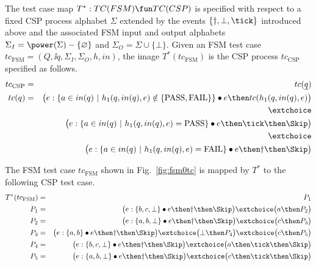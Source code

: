 The test case map $T^* :TC(FSM) \fun TC(CSP)$ is specified with respect to a fixed
CSP process alphabet $\Sigma$ extended by the events $\{\dag,\bot,\tick \}$ introduced
above
and the associated FSM input and output alphabets
$\Sigma_I = \power(\Sigma)-\{\varnothing\}$ and $\Sigma_O=\Sigma\cup \{\bot \}$.
Given an FSM test case $tc_\text{FSM}=(Q,\ii q,\Sigma_I,\Sigma_O,h,in)$, 
the image $T^*(tc_\text{FSM})$ is the CSP process $tc_\text{CSP}$ specified 
as follows.
\begin{eqnarray*}
tc_\text{CSP} & = & tc(\ii q)
\\
tc(q) & = & \big( e : \{ a\in in(q)~|~h_1(q,in(q),e)\notin \{\text{PASS},\text{FAIL}\} \} \bullet e \then tc(h_1(q,in(q),e) \big)
\\ & & \extchoice
\\ & & \big( e : \{ a\in in(q)~|~h_1(q,in(q),e) = \text{PASS} \} \bullet e \then \tick \then \Skip \big)
\\ & & \extchoice
\\ & & \big( e : \{ a\in in(q)~|~h_1(q,in(q),e) = \text{FAIL} \} \bullet e \then \dag \then \Skip \big)
\end{eqnarray*}


\begin{example}
The FSM test case $tc_\text{FSM}$
shown in Fig.~\ref{fig:fsm0tc} is mapped by $T^*$ to the following
CSP test case.
\begin{eqnarray*}
T^*(tc_\text{FSM}) & = & P_1
\\
P_1 & = & \big(e:\{ b,c,\bot \} \bullet e \then \dag\then\Skip\big)
\extchoice
 \big( a \then P_2 \big) 
\\
P_2 & = & \big( e : \{ a,b,\bot \}\bullet e\then \dag\then\Skip  \big)
\extchoice
\big( c\then P_3 \big)
\\
P_3 & = & \big( e : \{ a,b \}\bullet e\then \dag\then\Skip  \big)
\extchoice
\big( \bot \then P_4 \big)
\extchoice
\big( c\then P_5 \big)
\\
P_4 & = & \big( e : \{ b,c,\bot \}\bullet e\then \dag\then\Skip  \big)
\extchoice
\big( a\then\tick\then \Skip \big)
\\
P_5 & = & \big( e : \{ a,b,\bot \}\bullet e\then \dag\then\Skip  \big)
\extchoice
\big( c\then\tick\then \Skip \big)
\end{eqnarray*}
\xbox
\end{example}




